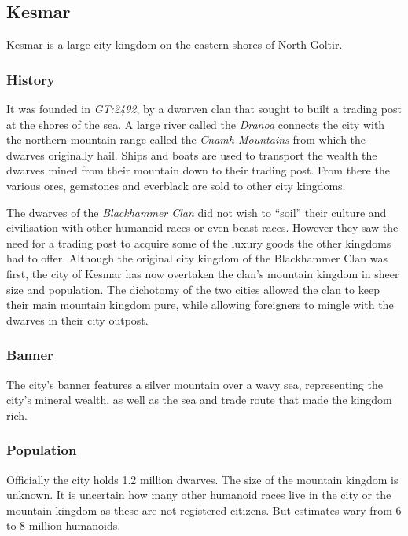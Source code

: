 \subsection{Kesmar}
\label{sec:Kesmar}

Kesmar is a large city kingdom on the eastern shores of
\hyperref[sec:Goltir]{North Goltir}.

\subsubsection*{History}

It was founded in \emph{GT:2492}, by a dwarven clan that sought to built a
trading post at the shores of the sea. A large river called the \emph{Dranoa}
connects the city with the northern mountain range called the
\emph{Cnamh Mountains} from which the dwarves originally hail. Ships and
boats are used to transport the wealth the dwarves mined from their mountain
down to their trading post. From there the various ores, gemstones and everblack
are sold to other city kingdoms.

The dwarves of the \emph{Blackhammer Clan} did not wish to ``soil'' their
culture and civilisation with other humanoid races or even beast
races. However they saw the need for a trading post to acquire some of the
luxury goods the other kingdoms had to offer. Although the original city
kingdom of the Blackhammer Clan was first, the city of Kesmar has now
overtaken the clan's mountain kingdom in sheer size and population. The
dichotomy of the two cities allowed the clan to keep their main mountain
kingdom pure, while allowing foreigners to mingle with the dwarves in their
city outpost.

\subsubsection*{Banner}

The city's banner features a silver mountain over a wavy sea, representing the
city's mineral wealth, as well as the sea and trade route that made the
kingdom rich.

\subsubsection*{Population}

Officially the city holds 1.2 million dwarves. The size of the mountain
kingdom is unknown. It is uncertain how many other humanoid races live in
the city or the mountain kingdom as these are not registered citizens. But
estimates wary from 6 to 8 million humanoids.

